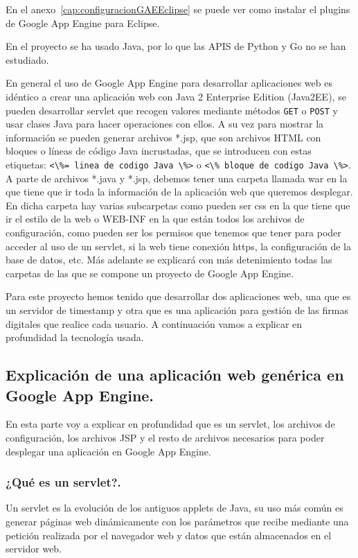 En el anexo~\ref{cap:configuracionGAEEclipse} se puede ver como instalar el plugins de Google App Engine para Eclipse.

En el proyecto se ha usado Java, por lo que las APIS de Python y Go no se han estudiado.

En general el uso de Google App Engine para desarrollar aplicaciones web es idéntico a crear una aplicación web con Java 2 Enterprise Edition (Java2EE), se pueden desarrollar servlet que recogen valores mediante métodos \lstinline{GET} o \lstinline{POST} y usar clases Java para hacer operaciones con ellos. A su vez para mostrar la información se pueden generar archivos *.jsp, que son archivos HTML con bloques o líneas de código Java incrustadas, que se introducen con estas etiquetas: \lstinline{<\%= linea de codigo Java \%>} o \lstinline{<\% bloque de codigo Java \%>}. A parte de archivos *.java y *.jsp, debemos tener una carpeta llamada war en la que tiene que ir toda la información de la aplicación web que queremos desplegar. En dicha carpeta hay varias subcarpetas como pueden ser css en la que tiene que ir el estilo de la web o WEB-INF en la que están todos los archivos de configuración, como pueden ser los permisos que tenemos que tener para poder acceder al uso de un servlet, si la web tiene conexión https, la configuración de la base de datos, etc. Más adelante se explicará con más detenimiento todas las carpetas de las que se compone un proyecto de Google App Engine.

Para este proyecto hemos tenido que desarrollar dos aplicaciones web, una que es un servidor de timestamp y otra que es una aplicación para gestión de las firmas digitales que realice cada usuario. A continuación vamos a explicar en profundidad la tecnología usada.

\subsection[Aplicación web genérica en GAE]{Explicación de una aplicación web genérica en Google App Engine.}
En esta parte voy a explicar en profundidad que es un servlet, los archivos de configuración, los archivos JSP y el resto de archivos necesarios para poder desplegar una aplicación en Google App Engine.
 
\subsubsection{¿Qué es un servlet?.}
Un servlet es la evolución de los antiguos applets de Java, su uso más común es generar páginas web dinámicamente con los parámetros que recibe mediante una petición realizada por el navegador web y datos que están almacenados en el servidor web.

